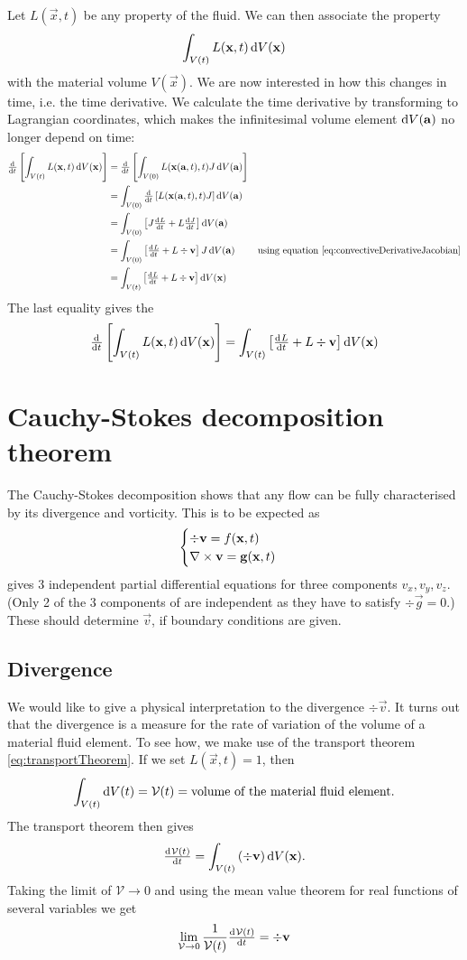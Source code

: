 Let $L(\vec{x},t)$ be any property of the fluid. We can then associate the property 
\[\int_{V(t)} L(\bm{\mathrm{x}},t) \operatorname{d \!}{V(\bm{\mathrm{x}})} \]
with the material volume $V(\vec{x})$. We are now interested in how this changes in time, i.e. the time derivative. We calculate the time derivative by transforming to Lagrangian coordinates, which makes the infinitesimal volume element $\operatorname{d \!}{V(\bm{\mathrm{a}})}$ no longer depend on time:
\begin{align*}
\od{}{t}\left[\int_{V(t)} L(\vec{x},t) \diff{V(\vec{x})}\right] &= \od{}{t}\left[\int_{V(0)} L(\vec{x}(\vec{a},t),t) J \diff{V(\vec{a})}\right] \\
&= \int_{V(0)} \od{}{t}\left[L(\vec{x}(\vec{a},t),t) J \right] \diff{V(\vec{a})} \\
&= \int_{V(0)} \left[J \od{L}{t} + L \od{J}{t} \right] \diff{V(\vec{a})} \\
&= \int_{V(0)} \left[\od{L}{t} + L \div \vec{v} \right] J \diff{V(\vec{a})} & \text{using equation \eqref{eq:convectiveDerivativeJacobian}} \\
&= \int_{V(t)} \left[\od{L}{t} + L \div \vec{v} \right] \diff{V(\vec{x})}
\end{align*}
The last equality gives the 
\begin{equation}
\od{}{t}\left[\int_{V(t)} L(\vec{x},t) \diff{V(\vec{x})}\right] = \int_{V(t)} \left[\od{L}{t} + L \div \vec{v} \right] \diff{V(\vec{x})} \label{eq:transportTheorem}
\end{equation}


\section{Cauchy-Stokes decomposition theorem}
The Cauchy-Stokes decomposition shows that any flow can be fully characterised by its divergence and vorticity. This is to be expected as
\[ \begin{cases}
\div \bm{\mathrm{v}} = f(\bm{\mathrm{x}},t) \\
\mathop{}\! \nabla\times \bm{\mathrm{v}} = \bm{\mathrm{g}}(\bm{\mathrm{x}},t)
\end{cases} \]
gives 3 independent partial differential equations for three components $v_x, v_y, v_z$. (Only 2 of the 3 components of  are independent as they have to satisfy $\div \vec{g} = 0$.) These should determine $\vec{v}$, if boundary conditions are given.
\subsection{Divergence} 
We would like to give a physical interpretation to the divergence $\div \vec{v}$. It turns out that the divergence is a measure for the rate of variation of the volume of a material fluid element. To see how, we make use of the transport theorem \eqref{eq:transportTheorem}. If we set $L(\vec{x},t) = 1$, then
\[ \int_{V(t)}\operatorname{d \!}{V(t)} = \mathcal{V}(t) = \text{volume of the material fluid element.} \]
The transport theorem then gives
\[ \od{\mathcal{V}(t)}{t} = \int_{V(t)} \left(\div\vec{v}\right)\diff{V(\vec{x})}. \]
Taking the limit of $\mathcal{V} \to 0$ and using the mean value theorem for real functions of several variables we get
\[ \lim_{\mathcal{V}\to 0} \frac{1}{\mathcal{V}(t)}\od{\mathcal{V}(t)}{t} = \div \vec{v} \]
